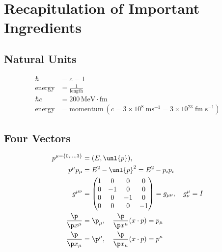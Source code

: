 \documentclass[a4paper, 11pt, normalem]{report}
\begin{document}
\chapter{Recapitulation of Important Ingredients}

\section{Natural Units}
\vspace{-20pt}
\begin{align}
    \hbar &= c = 1 \\
    \text{energy} &= \frac{1}{\text{length}} \\
    \hbar c &= 200\,\text{MeV}\cdot\text{fm} \\
    \text{energy} &= \text{momentum}~ (c = 3\times10^8\;\text{ms}^{-1} = 3\times10^{23}\;\text{fm s}^{-1})
\end{align}

\section{Four Vectors}
\vspace{-20pt}
\begin{align}
    p^{\mu=\{0,\dots,3\}} &= (E,\unl{p}), \\
    p^\mu p_\mu &= E^2 - \unl{p}^2 = E^2 - p_ip_i \\
    g^{\mu\nu} &= \begin{pmatrix} 1 & 0 & 0 & 0 \\ 0 & -1 & 0 & 0 \\ 0 & 0 & -1 & 0 \\ 0 & 0 & 0 & -1 \end{pmatrix} = g_{\mu\nu}, \quad
    g^\mu_\nu = I \\
    \frac{\p}{\p x^\mu} &= \p_\mu,\quad
    \frac{\p}{\p x^\mu} (x\cdot p) = p_\mu \\
    \frac{\p}{\p x_\mu} &= \p^\mu,\quad
    \frac{\p}{\p x_\mu} (x\cdot p) = p^\mu
\end{align}
\end{document}
